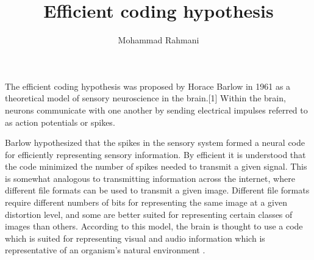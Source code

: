 \documentclass[a4paper]{article}
\title{Efficient coding hypothesis}
\date{}
\author{Mohammad Rahmani}
\begin{document}
    \maketitle
    The efficient coding hypothesis was proposed by Horace Barlow in 1961 as a theoretical model of sensory neuroscience in the brain.[1] Within the brain, neurons communicate with one another by sending electrical impulses referred to as action potentials or spikes.
    
    Barlow hypothesized that the spikes in the sensory system formed a neural code for efficiently representing sensory information. By efficient it is understood that the code minimized the number of spikes needed to transmit a given signal. This is somewhat analogous to transmitting information across the internet, where different file formats can be used to transmit a given image. Different file formats require different numbers of bits for representing the same image at a given distortion level, and some are better suited for representing certain classes of images than others. According to this model, the brain is thought to use a code which is suited for representing visual and audio information which is representative of an organism's natural environment .
%    
%    
\end{document}
